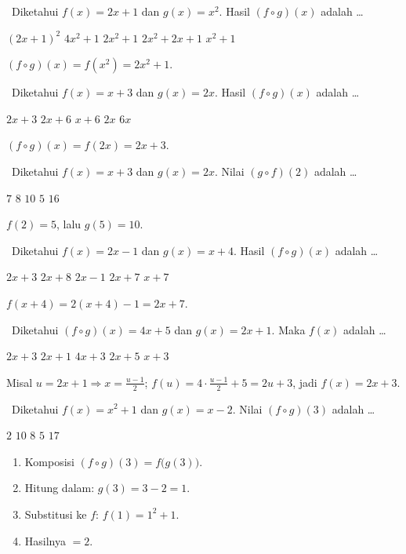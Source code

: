 \documentclass[11pt,a4paper]{exam}
\newenvironment{langkah}{%
  \begin{enumerate}[label=\textbf{Langkah \arabic*:},leftmargin=2.6em,
    itemsep=2pt,topsep=2pt]}{\end{enumerate}}
\newcommand{\Fund}{{\footnotesize\textsf{\textcolor{hijau}{[Fundamental]}}}\ }
\newcommand{\Inter}{{\footnotesize\textsf{\textcolor{biru}{[Intermediate]}}}\ }
\newcommand{\Adv}{{\footnotesize\textsf{\textcolor{oranye}{[Advanced]}}}\ }
\begin{document}
\begin{questions}

\question \Fund Diketahui $f(x) = 2x+1$ dan $g(x) = x^{2}$. Hasil $(f\circ g)(x)$ adalah \dots
\begin{choices}
\choice $(2x+1)^{2}$ \choice $4x^{2}+1$ \CorrectChoice $2x^{2}+1$
\choice $2x^{2}+2x+1$ \choice $x^{2}+1$
\end{choices}
\begin{solution}$(f\circ g)(x) = f(x^{2}) = 2x^{2}+1.$\end{solution}

\question \Fund Diketahui $f(x) = x+3$ dan $g(x) = 2x$. Hasil $(f\circ g)(x)$ adalah \dots
\begin{choices}
\CorrectChoice $2x+3$ \choice $2x+6$ \choice $x+6$ \choice $2x$ \choice $6x$
\end{choices}
\begin{solution}$(f\circ g)(x) = f(2x) = 2x+3.$\end{solution}

\question \Inter Diketahui $f(x) = x+3$ dan $g(x) = 2x$. Nilai $(g\circ f)(2)$ adalah \dots
\begin{choices}
\choice $7$ \choice $8$ \CorrectChoice $10$ \choice $5$ \choice $16$
\end{choices}
\begin{solution}$f(2) = 5$, lalu $g(5) = 10.$\end{solution}

\question \Inter Diketahui $f(x) = 2x-1$ dan $g(x) = x+4$. Hasil $(f\circ g)(x)$ adalah \dots
\begin{choices}
\choice $2x+3$ \choice $2x+8$ \choice $2x-1$ \CorrectChoice $2x+7$ \choice $x+7$
\end{choices}
\begin{solution}$f(x+4) = 2(x+4)-1 = 2x+7.$\end{solution}

\question \Inter Diketahui $(f\circ g)(x) = 4x+5$ dan $g(x) = 2x+1$. Maka $f(x)$ adalah \dots
\begin{choices}
\CorrectChoice $2x+3$ \choice $2x+1$ \choice $4x+3$ \choice $2x+5$ \choice $x+3$
\end{choices}
\begin{solution}Misal $u=2x+1 \Rightarrow x=\tfrac{u-1}{2}$;
$f(u)=4\cdot\tfrac{u-1}{2}+5 = 2u+3$, jadi $f(x)=2x+3.$\end{solution}

\question \Adv Diketahui $f(x) = x^{2}+1$ dan $g(x) = x-2$. Nilai $(f\circ g)(3)$ adalah \dots
\begin{choices}
\CorrectChoice $2$ \choice $10$ \choice $8$ \choice $5$ \choice $17$
\end{choices}
\begin{solution}
\begin{langkah}
\item Komposisi $(f\circ g)(3) = f\big(g(3)\big)$.
\item Hitung dalam: $g(3) = 3-2 = 1$.
\item Substitusi ke $f$: $f(1) = 1^{2}+1$.
\item Hasilnya $= 2$.
\end{langkah}
\end{solution}


\end{questions}
\end{document}
